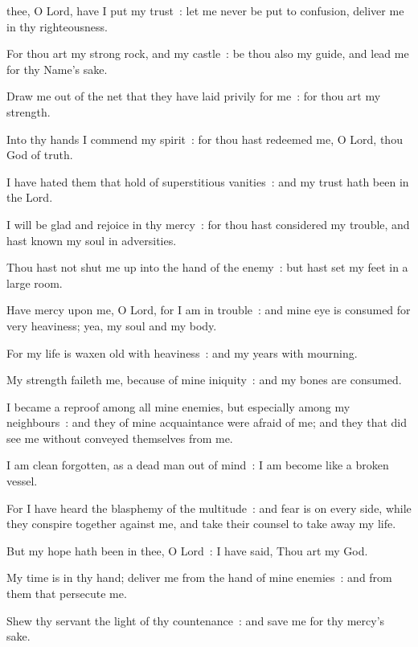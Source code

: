  thee, O Lord, have I put my trust~: let me never be put to confusion, deliver me in thy righteousness.\par
{}
For thou art my strong rock, and my castle~: be thou also my guide, and lead me for thy Name's sake.\par
{}Draw me out of the net that they have laid privily for me~: for thou art my strength.\par
{}Into thy hands I commend my spirit~: for thou hast redeemed me, O Lord, thou God of truth.\par
{}I have hated them that hold of superstitious vanities~: and my trust hath been in the Lord.\par
{}I will be glad and rejoice in thy mercy~: for thou hast considered my trouble, and hast known my soul in adversities.\par
{}Thou hast not shut me up into the hand of the enemy~: but hast set my feet in a large room.\par
{}Have mercy upon me, O Lord, for I am in trouble~: and mine eye is consumed for very heaviness; yea, my soul and my body.\par
{}For my life is waxen old with heaviness~: and my years with mourning.\par
{}My strength faileth me, because of mine iniquity~: and my bones are consumed.\par
{}I became a reproof among all mine enemies, but especially among my neighbours~: and they of mine acquaintance were afraid of me; and they that did see me without conveyed themselves from me.\par
{}I am clean forgotten, as a dead man out of mind~: I am become like a broken vessel.\par
{}For I have heard the blasphemy of the multitude~: and fear is on every side, while they conspire together against me, and take their counsel to take away my life.\par
{}But my hope hath been in thee, O Lord~: I have said, Thou art my God.\par
{}My time is in thy hand; deliver me from the hand of mine enemies~: and from them that persecute me.\par
{}Shew thy servant the light of thy countenance~: and save me for thy mercy's sake.\par
